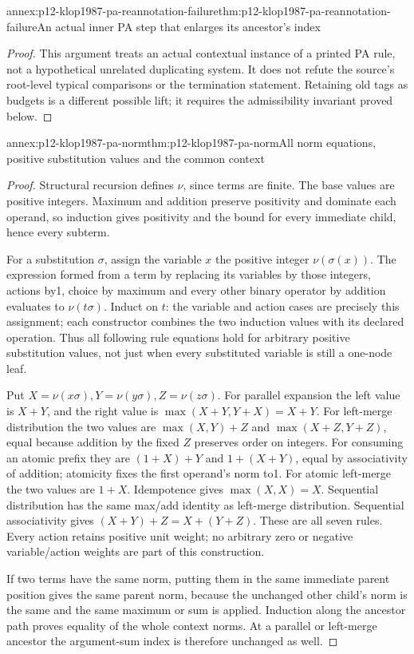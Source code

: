 \begin{annexitem}{annex:p12-klop1987-pa-reannotation-failure}{thm:p12-klop1987-pa-reannotation-failure}{An actual inner PA step that enlarges its ancestor's index}
\begin{proof}
This argument treats an actual contextual instance of a printed
PA rule, not a hypothetical unrelated duplicating system. It does
not refute the source's root-level typical comparisons or the
termination statement. Retaining old tags as budgets is a different
possible lift; it requires the admissibility invariant proved below.
\end{proof}
\end{annexitem}

\begin{annexitem}{annex:p12-klop1987-pa-norm}{thm:p12-klop1987-pa-norm}{All norm equations, positive substitution values and the common context}
\begin{proof}
Structural recursion defines \(\nu\), since terms are finite.
The base values are positive integers. Maximum and addition preserve
positivity and dominate each operand, so induction gives positivity
and the bound for every immediate child, hence every subterm.

For a substitution \(\sigma\), assign the variable \(x\) the
positive integer \(\nu(\sigma(x))\). The expression formed
from a term by replacing its variables by those integers, actions
by1, choice by maximum and every other binary operator by addition
evaluates to \(\nu(t\sigma)\). Induct on \(t\): the variable
and action cases are precisely this assignment; each constructor
combines the two induction values with its declared operation.
Thus all following rule equations hold for arbitrary positive
substitution values, not just when every substituted variable is
still a one-node leaf.

Put \(X=\nu(x\sigma),Y=\nu(y\sigma),Z=\nu(z\sigma)\).
For parallel expansion the left value is \(X+Y\), and the
right value is \(\max(X+Y,Y+X)=X+Y\). For left-merge
distribution the two values are
\(\max(X,Y)+Z\) and \(\max(X+Z,Y+Z)\), equal because
addition by the fixed \(Z\) preserves order on integers.
For consuming an atomic prefix they are
\((1+X)+Y\) and \(1+(X+Y)\), equal by associativity of
addition; atomicity fixes the first operand's norm to1.
For atomic left-merge the two values are \(1+X\).
Idempotence gives \(\max(X,X)=X\). Sequential distribution
has the same max/add identity as left-merge distribution.
Sequential associativity gives \((X+Y)+Z=X+(Y+Z)\).
These are all seven rules. Every action retains positive unit
weight; no arbitrary zero or negative variable/action weights
are part of this construction.

If two terms have the same norm, putting them in the same immediate
parent position gives the same parent norm, because the unchanged
other child's norm is the same and the same maximum or sum is
applied. Induction along the ancestor path proves equality of the
whole context norms. At a parallel or left-merge ancestor the
argument-sum index is therefore unchanged as well.


\end{proof}
\end{annexitem}
